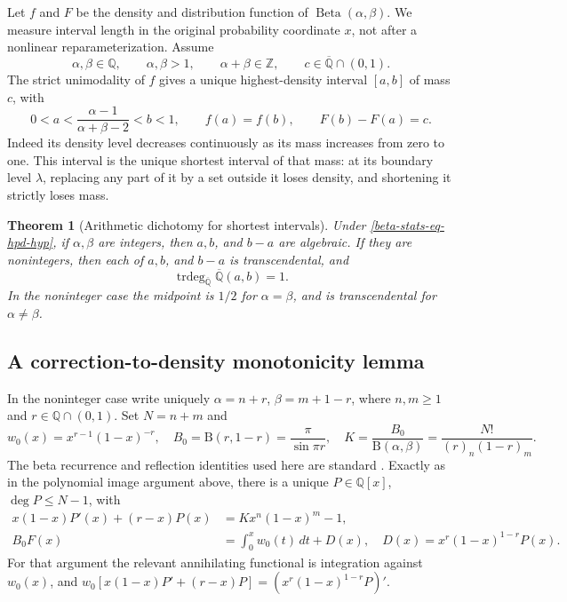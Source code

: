 \documentclass[11pt,a4paper]{article}
\newtheorem{theorem}{Theorem}[section]
\theoremstyle{definition}
\theoremstyle{remark}
\numberwithin{equation}{section}
\begin{document}
Let $f$ and $F$ be the density and distribution function of
$\operatorname{Beta}(\alpha,\beta)$. We measure interval length in
the original probability coordinate $x$, not after a nonlinear
reparameterization. Assume
\begin{equation}
\label{beta-stats-eq-hpd-hyp}
\alpha,\beta\in\mathbb Q,\qquad \alpha,\beta>1,\qquad
\alpha+\beta\in\mathbb Z,\qquad
c\in\overline{\mathbb Q}\cap(0,1).
\end{equation}
The strict unimodality of $f$ gives a unique highest-density interval
$[a,b]$ of mass $c$, with
\[
0<a<\frac{\alpha-1}{\alpha+\beta-2}<b<1,
\qquad f(a)=f(b),\qquad F(b)-F(a)=c.
\]
Indeed its density level decreases continuously as its mass increases
from zero to one. This interval is the unique shortest interval of
that mass: at its boundary level $\lambda$, replacing any part of it
by a set outside it loses density, and shortening it strictly loses
mass.

\begin{theorem}[Arithmetic dichotomy for shortest intervals]
\label{beta-stats-thm-hpd}
Under \eqref{beta-stats-eq-hpd-hyp}, if $\alpha,\beta$ are integers,
then $a,b$, and $b-a$ are algebraic. If they are nonintegers, then
each of $a,b$, and $b-a$ is transcendental, and
\[
\operatorname{trdeg}_{\overline{\mathbb Q}}
\overline{\mathbb Q}(a,b)=1.
\]
In the noninteger case the midpoint is $1/2$ for $\alpha=\beta$,
and is transcendental for $\alpha\ne\beta$.
\end{theorem}

\subsection{A correction-to-density monotonicity lemma}

In the noninteger case write uniquely
$\alpha=n+r$, $\beta=m+1-r$, where $n,m\ge1$ and
$r\in\mathbb Q\cap(0,1)$. Set $N=n+m$ and
\[
w_0(x)=x^{r-1}(1-x)^{-r},\quad
B_0=\mathrm B(r,1-r)=\frac\pi{\sin\pi r},\quad
K=\frac{B_0}{\mathrm B(\alpha,\beta)}
=\frac{N!}{(r)_n(1-r)_m}.
\]
The beta recurrence and reflection identities used here are standard
\cite{beta-stats-dlmf}. Exactly as in the polynomial image argument
above, there is a unique $P\in\mathbb Q[x]$, $\deg P\le N-1$, with
\begin{align}
x(1-x)P'(x)+(r-x)P(x)&=Kx^n(1-x)^m-1,
\label{beta-stats-eq-hpd-correction}\\
B_0F(x)&=\int_0^x w_0(t)\,dt+D(x),\quad
D(x)=x^r(1-x)^{1-r}P(x).
\label{beta-stats-eq-hpd-primitive}
\end{align}
For that argument the relevant annihilating functional is integration
against $w_0(x)$, and
$w_0[x(1-x)P'+(r-x)P]=(x^r(1-x)^{1-r}P)'$.
\end{document}
